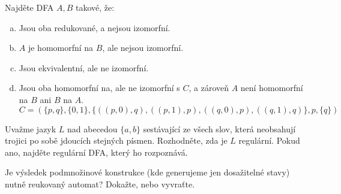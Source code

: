 \documentclass[a4paper,12pt]{amsart}
\begin{document}
\medskip\begin{problem}

    Najděte DFA $A,B$ takové, že:  

    \begin{enumerate}[(a)]\setlength\itemsep{6pt}
        \item Jsou oba redukované, a nejsou izomorfní. 
        \item $A$ je homomorfní na $B$, ale nejsou izomorfní.
        \item Jsou ekvivalentní, ale ne izomorfní.
        \item Jsou oba homomorfní na, ale ne izomorfní s $C$, a zároveň $A$ není homomorfní na $B$ ani $B$ na $A$.
        $$
        C=(\{p,q\},\{0,1\},\{((p,0),q),((p,1),p),((q,0),p),((q,1),q)\},p,\{q\})
        $$
    \end{enumerate}

\end{problem}


\medskip\begin{problem}
    
   Uvažme jazyk $L$ nad abecedou $\{a,b\}$ sestávající ze všech slov, která neobsahují trojici po sobě jdoucích stejných písmen. Rozhodněte, zda je $L$ regulární. Pokud ano, najděte regulární DFA, který ho rozpoznává.

\end{problem}


\medskip\begin{problem}
    
    Je výsledek podmnožinové konstrukce (kde generujeme jen dosažitelné stavy) nutně reukovaný automat? Dokažte, nebo vyvraťte.

\end{problem}
\end{document}
